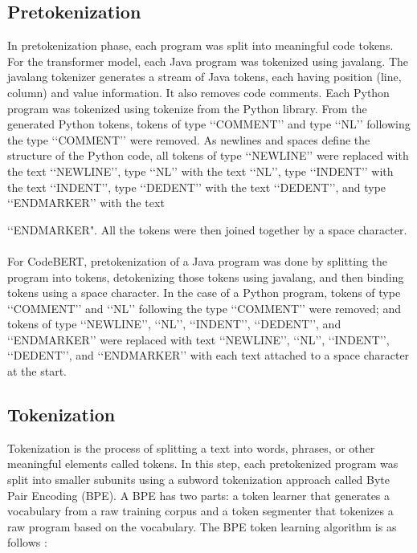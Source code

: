 \subsection{Pretokenization}
In pretokenization phase, each program was split into meaningful code tokens. For the transformer model, each Java program was tokenized using javalang. The javalang tokenizer generates a stream of Java tokens, each having position (line, column) and value information. It also removes code comments. Each Python program was tokenized using tokenize from the Python library. From the generated Python tokens, tokens of type {\lq\lq COMMENT\rq\rq} and type {\lq\lq NL\rq\rq} following the type {\lq\lq COMMENT\rq\rq} were removed. As newlines and spaces define the structure of the Python code, all tokens of type {\lq\lq NEWLINE\rq\rq} were replaced with the text {\lq\lq NEWLINE\rq\rq}, type {\lq\lq NL\rq\rq} with the text {\lq\lq NL\rq\rq}, type {\lq\lq INDENT\rq\rq} with the text {\lq\lq INDENT\rq\rq}, type {\lq\lq DEDENT\rq\rq} with the text {\lq\lq DEDENT\rq\rq}, and type {\lq\lq ENDMARKER\rq\rq} with the text {\lq\lq ENDMARKER". All the tokens were then joined together by a space character.
\\\\
For CodeBERT, pretokenization of a Java program was done by splitting the program into tokens, detokenizing those tokens using javalang, and then binding tokens using a space character. In the case of a Python program, tokens of type {\lq\lq COMMENT\rq\rq} and {\lq\lq NL\rq\rq} following the type {\lq\lq COMMENT\rq\rq} were removed; and tokens of type {\lq\lq NEWLINE\rq\rq}, {\lq\lq NL\rq\rq}, {\lq\lq INDENT\rq\rq}, {\lq\lq DEDENT\rq\rq}, and {\lq\lq ENDMARKER\rq\rq} were replaced with text {\lq\lq NEWLINE\rq\rq}, {\lq\lq NL\rq\rq}, {\lq\lq INDENT\rq\rq}, {\lq\lq DEDENT\rq\rq}, and {\lq\lq ENDMARKER\rq\rq} with each text attached to a space character at the start.

\subsection{Tokenization}
Tokenization is the process of splitting a text into words, phrases, or other meaningful elements called tokens. In this step, each pretokenized program was split into smaller subunits using a subword tokenization approach called Byte Pair Encoding (BPE). A BPE has two parts: a token learner that generates a vocabulary from a raw training corpus and a token segmenter that tokenizes a raw program based on the vocabulary. The BPE token learning algorithm is as follows \cite{jurafsky_martin}:

}
